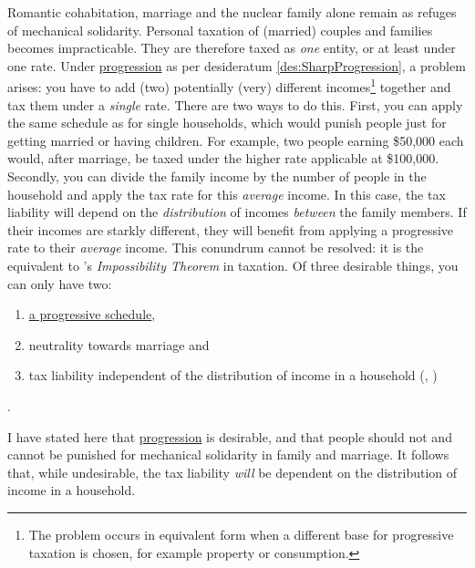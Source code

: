 
Romantic cohabitation, marriage and the nuclear family alone remain as refuges of mechanical solidarity.
Personal taxation of (married) couples and families becomes impracticable.
They are therefore taxed as \emph{one} entity, or at least under one rate.
Under \href{des:SharpProgression}{progression} as per desideratum \ref{des:SharpProgression}, a problem arises:
you have to add (two) potentially (very) different incomes\footnote{The problem occurs in equivalent form when a different base for progressive taxation is chosen, for example property or consumption.} together and tax them under a \emph{single} rate.
There are two ways to do this.
First, you can apply the same schedule as for single households, which would punish people just for getting married or having children.
For example, two people earning \$50,000 each would, after marriage, be taxed under the higher rate applicable at \$100,000.
Secondly, you can divide the family income by the number of people in the household and apply the tax rate for this \emph{average} income.
In this case, the tax liability will depend on the \emph{distribution} of incomes \emph{between} the family members.
If their incomes are starkly different, they will benefit from applying a progressive rate to their \emph{average} income.
This conundrum cannot be resolved:
it is the equivalent to \citeauthor{Arrow1950}'s \emph{Impossibility Theorem} in taxation.
Of three desirable things, you can only have two:
\begin{enumerate}
	\item \href{des:SharpProgression}{a progressive schedule},
	\item neutrality towards marriage and
	\item tax liability independent of the distribution of income in a household (\citealt[124]{Moffitt2003}, \citealt[29]{Dalsgaard2005})
\end{enumerate}
.

I have stated here that \href{des:SharpProgression}{progression} is desirable, and that people should not and cannot be punished for mechanical solidarity in family and marriage.
It follows that, while undesirable, the tax liability \emph{will} be dependent on the distribution of income in a household.

